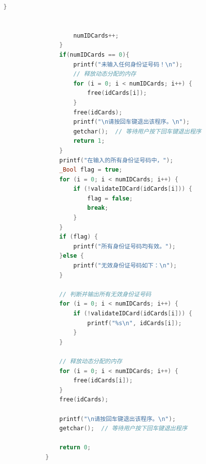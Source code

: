 \documentclass[withoutpreface,bwprint]{cumcmthesis}  %
\begin{document}
\begin{lstlisting}[language=c]
					}
					
					
					numIDCards++;
				}
				if(numIDCards == 0){
					printf("未输入任何身份证号码！\n");
					// 释放动态分配的内存
					for (i = 0; i < numIDCards; i++) {
						free(idCards[i]);
					}
					free(idCards);
					printf("\n请按回车键退出该程序。\n");
					getchar();  // 等待用户按下回车键退出程序
					return 1;
				}
				printf("在输入的所有身份证号码中，");
				_Bool flag = true;
				for (i = 0; i < numIDCards; i++) {
					if (!validateIDCard(idCards[i])) {
						flag = false;
						break;
					}
				}
				if (flag) {
					printf("所有身份证号码均有效。");
				}else {
					printf("无效身份证号码如下：\n");
				}
				
				// 判断并输出所有无效身份证号码
				for (i = 0; i < numIDCards; i++) {
					if (!validateIDCard(idCards[i])) {
						printf("%s\n", idCards[i]);
					}
				}
				
				// 释放动态分配的内存
				for (i = 0; i < numIDCards; i++) {
					free(idCards[i]);
				}
				free(idCards);
				
				printf("\n请按回车键退出该程序。\n");
				getchar();  // 等待用户按下回车键退出程序
				
				return 0;
			}
		\end{lstlisting}
		
	
\end{document}
